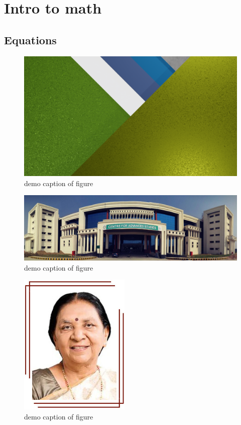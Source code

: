 \documentclass[a4paper,12pt]{article}%
\begin{document}
\section{Intro to math}

\subsection{Equations}
\begin{figure}
\includegraphics{./01.png}
\caption{demo caption of figure}
\end{figure}


\begin{figure}
\includegraphics{./img/01.png}
\caption{demo caption of figure}
\end{figure}

\begin{figure}
\includegraphics{./img/02.jpg}
\caption{demo caption of figure}
\end{figure}
\end{document}
